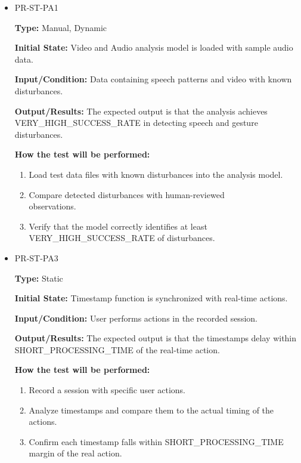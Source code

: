 \documentclass[12pt, titlepage]{article}
\begin{document}
\begin{itemize}
  \item PR-ST-PA1
  \begin{mdframed}[linewidth=0.5mm]
      \textbf{Type:} Manual, Dynamic \par
      \textbf{Initial State:} Video and Audio analysis model is loaded with sample audio data. \par
      \textbf{Input/Condition:} Data containing speech patterns and video with known \\disturbances. \par
      \textbf{Output/Results:} The expected output is that the analysis achieves \\VERY\_HIGH\_SUCCESS\_RATE in detecting speech and gesture disturbances. \par
      \textbf{How the test will be performed:}
      \begin{enumerate}[noitemsep]
        \item Load test data files with known disturbances into the analysis model.
        \item Compare detected disturbances with human-reviewed \\observations.
        \item Verify that the model correctly identifies at least \\VERY\_HIGH\_SUCCESS\_RATE of disturbances.
      \end{enumerate}
  \end{mdframed}
  \item PR-ST-PA3
  \begin{mdframed}[linewidth=0.5mm]
      \textbf{Type:} Static \par
      \textbf{Initial State:} Timestamp function is synchronized with real-time actions. \par
      \textbf{Input/Condition:} User performs actions in the recorded session. \par
      \textbf{Output/Results:} The expected output is that the timestamps delay within SHORT\_PROCESSING\_TIME of the real-time action. \par
      \textbf{How the test will be performed:}
      \begin{enumerate}[noitemsep]
        \item Record a session with specific user actions.
        \item Analyze timestamps and compare them to the actual timing of the actions.
        \item Confirm each timestamp falls within SHORT\_PROCESSING\_TIME margin of the real action.

\end{enumerate}
\end{mdframed}
\end{itemize}
\end{document}
